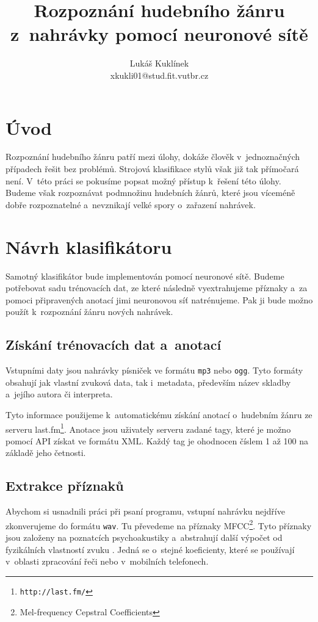 \documentclass[10pt,a4paper]{article}
\title{Rozpoznání hudebního žánru z~nahrávky pomocí neuronové sítě}
\author{Lukáš Kuklínek\\xkukli01@stud.fit.vutbr.cz}
\date{}
\begin{document}
\maketitle

\section{Úvod}

Rozpoznání hudebního žánru patří mezi úlohy, dokáže člověk v~jednoznačných případech řešit bez problémů.
Strojová klasifikace stylů však již tak přímočará není.
V~této práci se pokusíme popsat možný přístup k~řešení této úlohy.
Budeme však rozpoznávat podmnožinu hudebních žánrů, které jsou víceméně dobře rozpoznatelné
a~nevznikají velké spory o~zařazení nahrávek.

\section{Návrh klasifikátoru}

Samotný klasifikátor bude implementován pomocí neuronové sítě.
Budeme potřebovat sadu trénovacích dat, ze které následně vyextrahujeme příznaky
a~za pomoci připravených anotací jimi neuronovou síť natrénujeme.
Pak ji bude možno použít k~rozpoznání žánru nových nahrávek.

\subsection{Získání trénovacích dat a~anotací}

Vstupními daty jsou nahrávky písniček ve formátu \verb|mp3| nebo \verb|ogg|.
Tyto formáty obsahují jak vlastní zvuková data, tak i~metadata, především název
skladby a~jejího autora či interpreta.

Tyto informace použijeme k~automatickému získání anotací
o~hudebním žánru ze serveru last.fm\footnote{\texttt{http://last.fm/}}.
Anotace jsou uživately serveru zadané tagy, které je možno pomocí API získat ve formátu XML.
Každý tag je ohodnocen číslem 1 až 100 na základě jeho četnosti.

\subsection{Extrakce příznaků}

Abychom si usnadnili práci při psaní programu,
vstupní nahrávku nejdříve zkonverujeme do formátu \verb|wav|.
Tu převedeme na příznaky MFCC\footnote{Mel-frequency Cepstral Coefficients}.
Tyto příznaky jsou založeny na poznatcích psychoakustiky a~abstrahují
další výpočet od fyzikálních vlastností zvuku \cite{mfcc}.
Jedná se o~stejné koeficienty, které se používají v~oblasti zpracování řeči
nebo v~mobilních telefonech.
\end{document}
